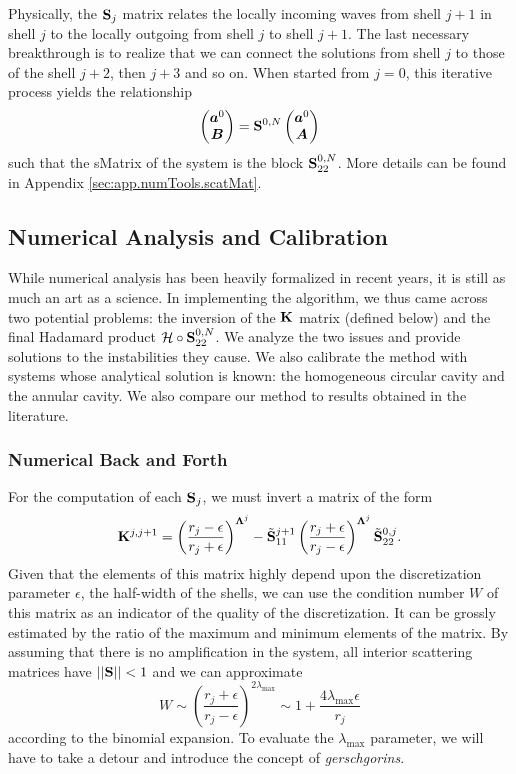 Physically, the $\mathbf{S}_j$ matrix relates the locally 
incoming waves from shell $j+1$ in shell $j$ to the locally 
outgoing from shell $j$ to shell $j+1$. The last necessary
breakthrough is to realize that we can connect the solutions
from shell $j$ to those of the shell $j+2$, then $j+3$ and 
so on. When started from $j=0$, this iterative process yields
the relationship
  \begin{equation}
   \begin{pmatrix}\boldsymbol{a}^0\\\boldsymbol{B}\end{pmatrix} = \mathbf{S}^{0,N}\begin{pmatrix}\boldsymbol{a}^0\\\boldsymbol{A}\end{pmatrix}
  \end{equation}
such that the \gls{sMatrix} of the system is
the block $\mathbf{S}_{22}^{0,N}$. More details can be found
in Appendix \ref{sec:app.numTools.scatMat}. 
  
\subsection{Numerical Analysis and Calibration}
While numerical analysis has been heavily formalized in recent years, 
it is still as much an art as a science. In implementing the algorithm, 
we thus came across two potential problems: the inversion of the 
$\mathbf{K}$ matrix (defined below) and the final Hadamard product
$\mathcal{H}\circ\mathbf{S}^{0,N}_{22}$. We analyze the two issues
and provide solutions to the instabilities they cause. We also 
calibrate the method with systems whose analytical solution
is known: the homogeneous circular cavity and the annular cavity.
We also compare our method to results obtained in the literature. 

\subsubsection{Numerical Back and Forth}
For the computation of each $\mathbf{S}_j$, we must invert
a matrix of the form 
  \begin{equation}
  \mathbf{K}^{j,j+1} = \left(\frac{r_j-\epsilon}{r_j+\epsilon}\right)^{\boldsymbol{\Lambda}^j}
		    -\tilde{\mathbf{S}}^{j+1}_{11}\left(\frac{r_j+\epsilon}{r_j-\epsilon}\right)^{\boldsymbol{\Lambda}^j}\tilde{\mathbf{S}}^{0,j}_{22}.
  \end{equation}
Given that the elements of this matrix highly depend upon the discretization
parameter $\epsilon$, the half-width of the shells, we can use the
condition number $W$ of this matrix as an indicator of the quality
of the discretization. It can be grossly estimated by the 
ratio of the maximum and minimum elements of the matrix. 
By assuming that there is no amplification in the system,
all interior scattering matrices have
$||\mathbf{S}||<1$ and we can approximate
  \begin{equation}
   W \sim \left(\frac{r_j+\epsilon}{r_j-\epsilon}\right)^{2\lambda_\text{max}}\sim 1 + \frac{4\lambda_\text{max}\epsilon}{r_j}
  \end{equation}
according to the binomial expansion.
To evaluate the $\lambda_\text{max}$ parameter, we will
have to take a detour and introduce the concept 
of \textit{\glspl{gerschgorin}}.

